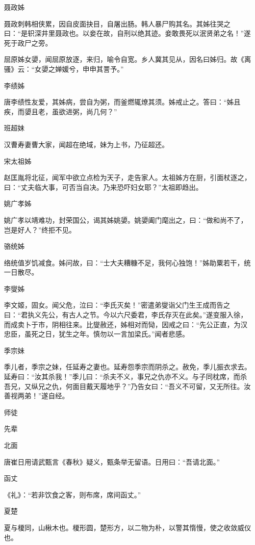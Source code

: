 \documentclass[a4paper,12pt,UTF8,twoside]{ctexbook}
\begin{document}
    聂政姊
    
    聂政刺韩相侠累，因自皮面抉目，自屠出肠。韩人暴尸购其名。其姊往哭之曰：“是轵深井里聂政也。以妾在故，自刑以绝其迹。妾敢畏死以泯贤弟之名！”遂死于政尸之旁。
    
    屈原姊女嬃，闻屈原放逐，来归，喻令自宽。乡人冀其见从，因名曰姊归。故《离骚》云：“女嬃之婵媛兮，申申其詈予。”
    
    李绩姊
    
    唐李绩性友爱，其姊病，尝自为粥，而釜燃辄燎其须。姊戒止之。答曰：“姊且疾，而嬃且老，虽欲进粥，尚几何？”
    
    班超妹
    
    汉曹寿妻曹大家，闻超在绝域，妹为上书，乃征超还。
    
    宋太祖姊
    
    赵匡胤将北征，闻军中欲立点检为天子，走告家人。太祖姊方在厨，引面杖逐之，曰：“丈夫临大事，可否当自决。乃来恐吓妇女耶？”太祖即趋出。
    
    姚广孝姊
    
    姚广孝以靖难功，封荣国公，谒其姊姚嬃。姚嬃阖门麾出之，曰：“做和尚不了，岂是好人？”终拒不见。
    
    骆统姊
    
    络统值岁饥减食。姊问故，曰：“士大夫糟糠不足，我何心独饱！”姊助粟若干，统一日散尽。
    
    李燮姊
    
    李文姬，固女。闻父危，泣曰：“李氏灭矣！”密遣弟燮诣父门生王成而告之曰：“君执义先公，有古人之节。今以六尺委君，李氏存灭在此矣。”遂变服入徐，而成卖卜于市，阴相往来。比燮赦还，姊相对而恸，因戒之曰：“先公正直，为汉忠臣，虽死之日，犹生之年。慎勿以一言加梁氏。”闻者悲感。
    
    季宗妹
    
    季儿者，季宗之妹，任延寿之妻也。延寿怨季宗而阴杀之。赦免，季儿振衣求去。延寿曰：“汝其杀我！”季儿曰：“杀夫不义，事兄之仇亦不义。与子同枕席，而杀吾兄，又纵兄之仇，何面目戴天履地乎？”乃告女曰：“吾义不可留，又无所往。汝善视两弟！”遂自经。
    
    师徒
    
    先辈
    
    北面
    
    唐崔日用请武甄言《春秋》疑义，甄条举无留语。日用曰：“吾请北面。”
    
    函丈
    
    《礼》：“若非饮食之客，则布席，席间函丈。”
    
    夏楚
    
    夏与榎同，山楸木也。榎形圆，楚形方，以二物为朴，以警其惰慢，使之收敛威仪也。
    
\end{document}
